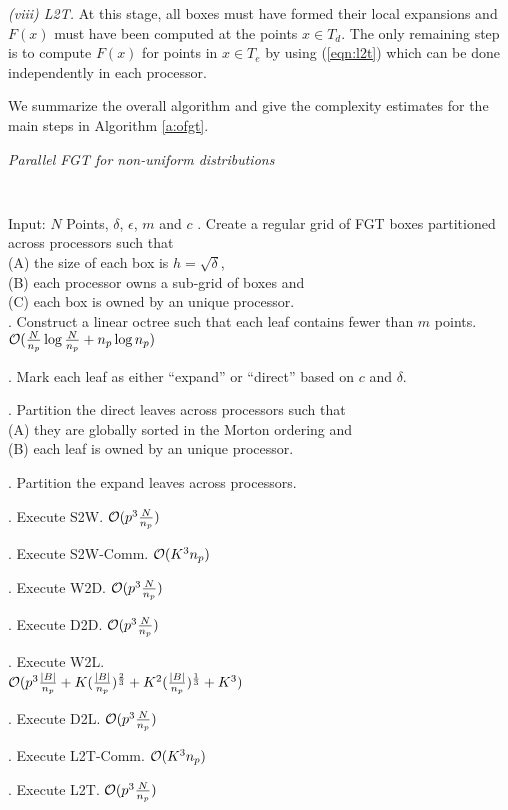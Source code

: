 {\em (viii) L2T.} At this stage, all boxes must have formed their local expansions and $F(x)$ must have been computed at
 the points $x \in T_d$. The only remaining step is to compute $F(x)$ for points in $x \in T_e$ by using (\ref{eqn:l2t}) 
 which can be done independently in each processor. 

We summarize the overall algorithm and give the complexity estimates for the main steps in Algorithm \ref{a:ofgt}.  

\begin{algorithm}[!h]
\caption{ \label{a:ofgt}
\em Parallel FGT for non-uniform distributions}
{\tt
\begin{algorithmic}
\STATE Input: $N$ Points, $\delta$, $\epsilon$, $m$ and $c$
. Create a regular grid of FGT boxes partitioned across processors such that \\
 (A) the size of each box is $h = \sqrt{\delta}$, \\
 (B) each processor owns a sub-grid of boxes and \\
 (C) each box is owned by an unique processor. \\

. Construct a linear octree such that each leaf contains fewer than $m$ points. \\
\hfill $\mathcal{O}(\frac{N}{n_p} \log{\frac{N}{n_p}} + n_p \log{n_p})$

. Mark each leaf as either ``expand'' or ``direct'' based on $c$ and $\delta$.

. Partition the direct leaves across processors such that \\
  (A) they are globally sorted in the Morton ordering and \\
  (B) each leaf is owned by an unique processor.

. Partition the expand leaves across processors. 

. Execute S2W. \hfill $\mathcal{O}(p^3 \frac{N}{n_p})$

. Execute S2W-Comm. \hfill $\mathcal{O}(K^3 n_p)$

. Execute W2D. \hfill $\mathcal{O}(p^3 \frac{N}{n_p})$

. Execute D2D. \hfill $\mathcal{O}(p^3 \frac{N}{n_p})$

. Execute W2L. \\
 \hfill $\mathcal{O}(p^3 \frac{|B|}{n_p} + K (\frac{|B|}{n_p})^{\frac{2}{3}} + K^2(\frac{|B|}{n_p})^{\frac{1}{3}} + K^3 )$ 

. Execute D2L. \hfill $\mathcal{O}(p^3 \frac{N}{n_p})$

. Execute L2T-Comm. \hfill $\mathcal{O}(K^3 n_p)$

. Execute L2T. \hfill $\mathcal{O}( p^3\frac{N}{n_p})$
\end{algorithmic}
}
\end{algorithm}


